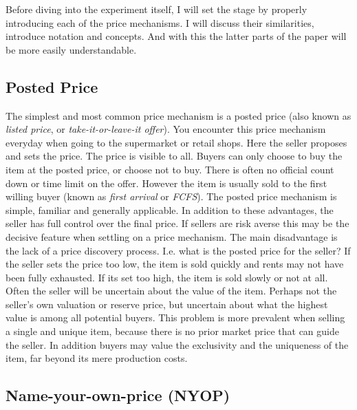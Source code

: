 \documentclass[a4paper,12pt]{article}
\begin{document}
	Before diving into the experiment itself, I will set the stage by properly introducing each of the price mechanisms. I will discuss their similarities, introduce notation and concepts. And with this the latter parts of the paper will be more easily understandable.

	\subsection{Posted Price}
	The simplest and most common price mechanism is a posted price (also known as {\it listed price}, or {\it take-it-or-leave-it offer}). You encounter this price mechanism everyday when going to the supermarket or retail shops. Here the seller proposes and sets the price. The price is visible to all. Buyers can only choose to buy the item at the posted price, or choose not to buy. There is often no official count down or time limit on the offer. However the item is usually sold to the first willing buyer (known as \emph{first arrival} or \emph{FCFS}). The posted price mechanism is simple, familiar and generally applicable. In addition to these advantages, the seller has full control over the final price. If sellers are risk averse this may be the decisive feature when settling on a price mechanism. The main disadvantage is the lack of a price discovery process. I.e. what is the posted price for the seller? If the seller sets the price too low, the item is sold quickly and rents may not have been fully exhausted. If its set too high, the item is sold slowly or not at all. Often the seller will be uncertain about the value of the item. Perhaps not the seller's own valuation or reserve price, but uncertain about what the highest value is among all potential buyers. This problem is more prevalent when selling a single and unique item, because there is no prior market price that can guide the seller. In addition buyers may value the exclusivity and the uniqueness of the item, far beyond its mere production costs.

	\subsection{Name-your-own-price (NYOP)}
\end{document}
